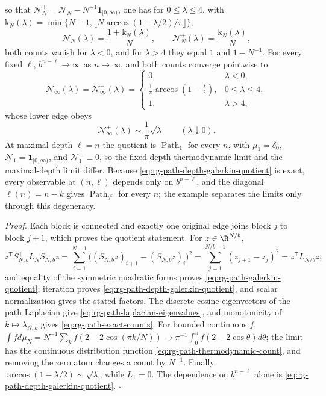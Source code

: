 so that \(\mathcal N^+_N=\mathcal N_N-N^{-1}\mathbf1_{[0,\infty)}\), one has for
\(0\leq\lambda\leq4\), with
\(\mathrm k_N(\lambda)=\min\{N-1,\lfloor N\arccos(1-\lambda/2)/\pi\rfloor\}\),
\begin{equation}
\mathcal N_N(\lambda)=\frac{1+\mathrm k_N(\lambda)}{N},
\qquad
\mathcal N^+_N(\lambda)=\frac{\mathrm k_N(\lambda)}{N},
\label{eq:rg-path-exact-counts}
\end{equation}
both counts vanish for \(\lambda<0\), and for \(\lambda>4\) they equal \(1\) and
\(1-N^{-1}\). For every fixed \(\ell\), \(b^{n-\ell}\to\infty\) as
\(n\to\infty\), and both counts converge pointwise to
\begin{equation}
\mathcal N_\infty(\lambda)=\mathcal N^+_\infty(\lambda)
=
\begin{cases}
0,&\lambda<0,\\[2pt]
\displaystyle\frac1\pi\arccos\left(1-\frac{\lambda}{2}\right),
&0\leq\lambda\leq4,\\[7pt]
1,&\lambda>4,
\end{cases}
\label{eq:rg-path-thermodynamic-count}
\end{equation}
whose lower edge obeys
\begin{equation}
\mathcal N^+_\infty(\lambda)\sim\frac1\pi\sqrt{\lambda}
\qquad(\lambda\downarrow0).
\label{eq:rg-path-lower-edge-count}
\end{equation}
At maximal depth \(\ell=n\) the quotient is \(\operatorname{Path}_1\) for every
\(n\), with \(\mu_1=\delta_0\), \(\mathcal N_1=\mathbf1_{[0,\infty)}\), and
\(\mathcal N^+_1\equiv0\), so the fixed-depth thermodynamic limit and the
maximal-depth limit differ. Because \eqref{eq:rg-path-depth-galerkin-quotient}
is exact, every observable at \((n,\ell)\) depends only on \(b^{n-\ell}\), and
the diagonal \(\ell(n)=n-k\) gives \(\operatorname{Path}_{b^k}\) for every
\(n\); the example separates the limits only through this degeneracy.

\noindent\emph{Proof.}
Each block is connected and exactly one original edge joins block \(j\) to
block \(j+1\), which proves the quotient statement. For \(z\in\R^{N/b}\),
\[
z^{\mathsf T}S_{N,b}^{\mathsf T}L_NS_{N,b}z
=\sum_{i=1}^{N-1}\bigl((S_{N,b}z)_{i+1}-(S_{N,b}z)_i\bigr)^2
=\sum_{j=1}^{N/b-1}(z_{j+1}-z_j)^2
=z^{\mathsf T}L_{N/b}z,
\]
and equality of the symmetric quadratic forms proves
\eqref{eq:rg-path-galerkin-quotient}; iteration proves
\eqref{eq:rg-path-depth-galerkin-quotient}, and scalar normalization gives the
stated factors. The discrete cosine eigenvectors of the path Laplacian give
\eqref{eq:rg-path-laplacian-eigenvalues}, and monotonicity of
\(k\mapsto\lambda_{N,k}\) gives \eqref{eq:rg-path-exact-counts}. For bounded
continuous \(f\),
\(\int fd\mu_N=N^{-1}\sum_kf(2-2\cos(\pi k/N))\to
\pi^{-1}\int_0^\pi f(2-2\cos\theta)d\theta\); the limit has the continuous
distribution function \eqref{eq:rg-path-thermodynamic-count}, and removing
the zero atom changes a count by \(N^{-1}\). Finally
\(\arccos(1-\lambda/2)\sim\sqrt\lambda\), while \(L_1=0\). The dependence on
\(b^{n-\ell}\) alone is \eqref{eq:rg-path-depth-galerkin-quotient}. \(\square\)

